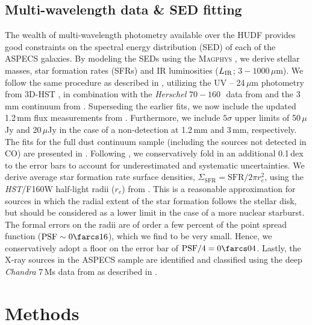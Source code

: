 \documentclass[twocolumn]{aastex62}
\newcommand{\SigmaSFR}{\ensuremath{\Sigma_{\mathrm{SFR}}}}
\begin{document}
\subsection{Multi-wavelength data \& SED fitting}
\label{sec:multi-wavel-data}
The wealth of multi-wavelength photometry available over the HUDF provides good
constraints on the spectral energy distribution (SED) of each of the ASPECS
galaxies.  By modeling the SEDs using the \textsc{Magphys}
\citep{DaCunha2008,DaCunha2015}, we derive stellar masses, star formation rates
(SFRs) and IR luminosities ($L_{\rm IR}$; $3 - 1000\,\mu$m).  We follow the
same procedure as described in \cite{Boogaard2019}, utilizing the UV --
24$\,\mu$m photometry from 3D-HST \citep{Skelton2014, Whitaker2014}, in
combination with the \emph{Herschel} $70 - 160$\,\micron\ data from
\cite{Elbaz2011} and the 3\,mm continuum from \cite{Gonzalez-Lopez2019}.
Superseding the earlier fits, we now include the updated 1.2\,mm flux
measurements from \cite{Gonzalez-Lopez2020}.  Furthermore, we include
$5 \sigma$ upper limits of 50\,$\mu$Jy and 20\,$\mu$Jy in the case of a
non-detection at 1.2\,mm and 3\,mm, respectively.  The fits for the full dust
continuum sample (including the sources not detected in CO) are presented in
\cite{Aravena2020}.  Following \cite{Aravena2020}, we conservatively fold in an
additional 0.1\,dex to the error bars to account for underestimated and
systematic uncertainties.  We derive average star formation rate surface
densities, $\SigmaSFR = \mathrm{SFR} / 2 \pi r_{e}^{2}$, using the
\emph{HST}/F160W half-light radii ($r_{e}$) from \cite{vanderWel2012}.  This is
a reasonable approximation for sources in which the radial extent of the star
formation follows the stellar disk, but should be considered as a lower limit
in the case of a more nuclear starburst.  The formal errors on the radii are of
order a few percent of the point spread function
($\mathrm{PSF} \sim 0\farcs16$), which we find to be very small.  Hence, we
conservatively adopt a floor on the error bar of $\mathrm{PSF}/4 = 0\farcs04$.
Lastly, the X-ray sources in the ASPECS sample are identified and classified
using the deep \emph{Chandra} 7\,Ms data from \cite{Luo2017} as described in
\cite{Boogaard2019}.

\section{Methods}
\label{sec:methods}
\end{document}
